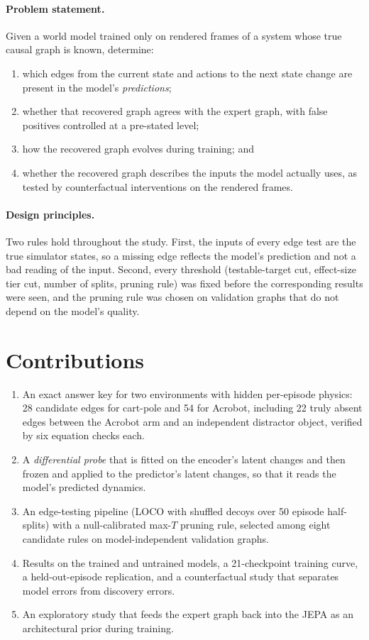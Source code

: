 \documentclass[11pt, a4paper, oneside,enumerate,textcomp]{report}
\begin{document}
\paragraph{Problem statement.} Given a world model trained only on rendered frames of a system whose true causal graph is known, determine:
\begin{enumerate}
	\item which edges from the current state and actions to the next state change are present in the model's \emph{predictions};
	\item whether that recovered graph agrees with the expert graph, with false positives controlled at a pre-stated level;
	\item how the recovered graph evolves during training; and
	\item whether the recovered graph describes the inputs the model actually uses, as tested by counterfactual interventions on the rendered frames.
\end{enumerate}

\paragraph{Design principles.} Two rules hold throughout the study. First, the inputs of every edge test are the true simulator states, so a missing edge reflects the model's prediction and not a bad reading of the input. Second, every threshold (testable-target cut, effect-size tier cut, number of splits, pruning rule) was fixed before the corresponding results were seen, and the pruning rule was chosen on validation graphs that do not depend on the model's quality.

\section{Contributions}

\begin{enumerate}
	\item An exact answer key for two environments with hidden per-episode physics: 28 candidate edges for cart-pole and 54 for Acrobot, including 22 truly absent edges between the Acrobot arm and an independent distractor object, verified by six equation checks each.
	\item A \emph{differential probe} that is fitted on the encoder's latent changes and then frozen and applied to the predictor's latent changes, so that it reads the model's predicted dynamics.
	\item An edge-testing pipeline (LOCO with shuffled decoys over 50 episode half-splits) with a null-calibrated max-$T$ pruning rule, selected among eight candidate rules on model-independent validation graphs.
	\item Results on the trained and untrained models, a 21-checkpoint training curve, a held-out-episode replication, and a counterfactual study that separates model errors from discovery errors.
	\item An exploratory study that feeds the expert graph back into the JEPA as an architectural prior during training.
\end{enumerate}
\end{document}
